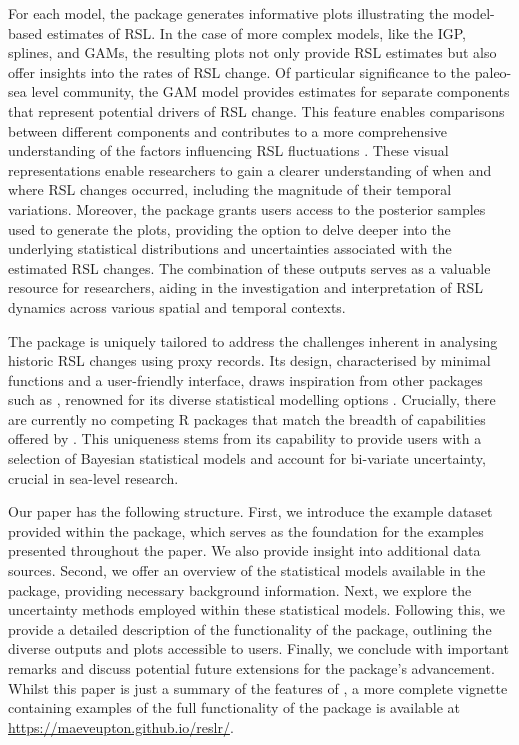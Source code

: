 For each model, the  package generates informative plots illustrating the model-based estimates of RSL. In the case of more complex models, like the IGP, splines, and GAMs, the resulting plots not only provide RSL estimates but also offer insights into the rates of RSL change. Of particular significance to the paleo-sea level community, the GAM model provides estimates for separate components that represent potential drivers of RSL change. This feature enables comparisons between different components and contributes to a more comprehensive understanding of the factors influencing RSL fluctuations \citep{Upton2023noisy}. These visual representations enable researchers to gain a clearer understanding of when and where RSL changes occurred, including the magnitude of their temporal variations. Moreover, the package grants users access to the posterior samples used to generate the plots, providing the option to delve deeper into the underlying statistical distributions and uncertainties associated with the estimated RSL changes. The combination of these outputs serves as a valuable resource for researchers, aiding in the investigation and interpretation of RSL dynamics across various spatial and temporal contexts.

The  package is uniquely tailored to address the challenges inherent in analysing historic RSL changes using proxy records. Its design, characterised by minimal functions and a user-friendly interface, draws inspiration from other packages such as , renowned for its diverse statistical modelling options \citep{wood2015package}. Crucially, there are currently no competing R packages that match the breadth of capabilities offered by . This uniqueness stems from its capability to provide users with a selection of Bayesian statistical models and account for bi-variate uncertainty, crucial in sea-level research.

Our paper has the following structure. First, we introduce the example dataset provided within the package, which serves as the foundation for the examples presented throughout the paper. We also provide insight into additional data sources. Second, we offer an overview of the statistical models available in the package, providing necessary background information. Next, we explore the uncertainty methods employed within these statistical models. Following this, we provide a detailed description of the functionality of the  package, outlining the diverse outputs and plots accessible to users. Finally, we conclude with important remarks and discuss potential future extensions for the package's advancement. Whilst this paper is just a summary of the features of , a more complete vignette containing examples of the full functionality of the package is available at \url{https://maeveupton.github.io/reslr/}.


